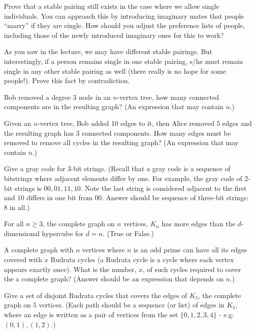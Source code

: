 \begin{Parts}
\Part Prove that a stable pairing still exists in the case where we allow single individuals. You can approach this by
introducing imaginary mates that people ``marry''
if they are single. How should you adjust the preference lists of
people, including those of the newly introduced imaginary ones for
this to work?

\Part As you saw in the lecture, we may have different stable pairings. But
interestingly, if a person remains single in one stable pairing, s/he
must remain single in any other stable pairing as well (there really
is no hope for some people!). Prove this fact by contradiction.


\end{Parts}



\begin{Parts}

\Part
Bob removed a degree $3$ node in an $n$-vertex tree, how many connected
components are in the resulting graph?  (An expression that may
contain $n$.)

\Part
Given an $n$-vertex tree, Bob added 10 edges to it, then Alice removed 
5 edges and the resulting graph has 3 connected components.
How many edges must be removed to remove all cycles
in the resulting graph? (An expression that may contain $n$.)

\Part
Give a gray code for 3-bit strings. (Recall that a gray code is a
sequence of bitstrings where adjacent elements differ by one.  For
example, the gray code of 2-bit strings is $00,01,11,10$.  Note the
last string is considered adjacent to the first and $10$ differs in
one bit from $00$. Answer should be sequence of three-bit strings: 8
in all.)

\Part
For all $n \geq 3$, the complete graph on $n$ vertices, $K_n$ has more
edges than the $d$-dimensional hypercube for $d=n$. (True or False.)


\Part
A complete graph with $n$ vertices where $n$ is an odd prime can have all its edges
covered with $x$ Rudrata cycles (a Rudrata cycle is a cycle where
each vertex appears exactly once). What is the number, $x$,  of
such cycles required to cover the a complete graph? (Answer should be an expression that depends on $n$.)


\Part
Give a set of disjoint Rudrata cycles that covers the edges of $K_5$, the complete
graph on $5$ vertices.
(Each path should be a sequence (or list) of edges in $K_5$, where an edge is written as a pair of vertices from the set $\{0, 1, 2, 3, 4\}$ - e.g: $(0, 1), (1, 2)$.)


\end{Parts}

